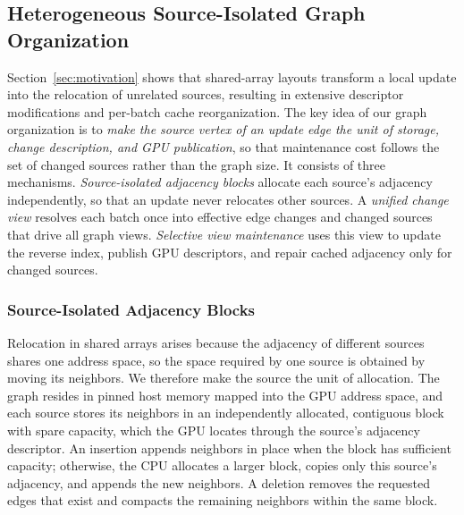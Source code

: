 \subsection{Heterogeneous Source-Isolated Graph Organization}
\label{sec:graph-organization}

Section~\ref{sec:motivation} shows that shared-array layouts transform a local update into the relocation of unrelated sources, resulting in extensive descriptor modifications and per-batch cache reorganization. The key idea of our graph organization is to \textit{make the source vertex of an update edge the unit of storage, change description, and GPU publication}, so that maintenance cost follows the set of changed sources rather than the graph size. It consists of three mechanisms. \textit{Source-isolated adjacency blocks} allocate each source's adjacency independently, so that an update never relocates other sources. A \textit{unified change view} resolves each batch once into effective edge changes and changed sources that drive all graph views. \textit{Selective view maintenance} uses this view to update the reverse index, publish GPU descriptors, and repair cached adjacency only for changed sources.


\subsubsection{Source-Isolated Adjacency Blocks}
\label{sec:source-layout}
Relocation in shared arrays arises because the adjacency of different sources shares one address space, so the space required by one source is obtained by moving its neighbors. We therefore make the source the unit of allocation. The graph resides in pinned host memory mapped into the GPU address space, and each source stores its neighbors in an independently allocated, contiguous block with spare capacity, which the GPU locates through the source's adjacency descriptor. An insertion appends neighbors in place when the block has sufficient capacity; otherwise, the CPU allocates a larger block, copies only this source's adjacency, and appends the new neighbors. A deletion removes the requested edges that exist and compacts the remaining neighbors within the same block.

